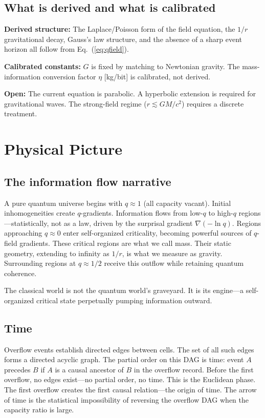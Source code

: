\documentclass[reprint]{revtex4-2}
\begin{document}
\subsection{What is derived and what is calibrated}

\textbf{Derived structure:} The Laplace/Poisson form of the field equation, the $1/r$ gravitational decay, Gauss's law structure, and the absence of a sharp event horizon all follow from Eq.~(\ref{eq:qfield}).

\textbf{Calibrated constants:} $G$ is fixed by matching to Newtonian gravity. The mass-information conversion factor $\eta$ [kg/bit] is calibrated, not derived.

\textbf{Open:} The current equation is parabolic. A hyperbolic extension is required for gravitational waves. The strong-field regime ($r\lesssim GM/c^2$) requires a discrete treatment.

\section{Physical Picture}

\subsection{The information flow narrative}

A pure quantum universe begins with $q\approx 1$ (all capacity vacant). Initial inhomogeneities create $q$-gradients. Information flows from low-$q$ to high-$q$ regions---statistically, not as a law, driven by the surprisal gradient $\nabla(-\ln q)$. Regions approaching $q\approx 0$ enter self-organized criticality, becoming powerful sources of $q$-field gradients. These critical regions are what we call mass. Their static geometry, extending to infinity as $1/r$, is what we measure as gravity. Surrounding regions at $q\approx 1/2$ receive this outflow while retaining quantum coherence.

The classical world is not the quantum world's graveyard. It is its engine---a self-organized critical state perpetually pumping information outward.

\subsection{Time}

Overflow events establish directed edges between cells. The set of all such edges forms a directed acyclic graph. The partial order on this DAG is time: event $A$ precedes $B$ if $A$ is a causal ancestor of $B$ in the overflow record. Before the first overflow, no edges exist---no partial order, no time. This is the Euclidean phase. The first overflow creates the first causal relation---the origin of time. The arrow of time is the statistical impossibility of reversing the overflow DAG when the capacity ratio is large.
\end{document}

